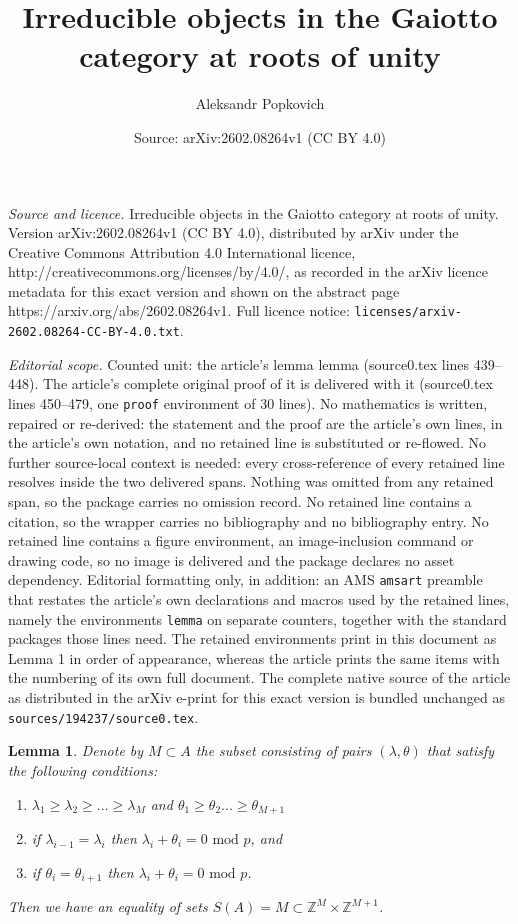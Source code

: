 \documentclass[10pt,a4paper]{amsart}
\title{Irreducible objects in the Gaiotto category at roots of unity}
\author{Aleksandr Popkovich}
\date{Source: arXiv:2602.08264v1 (CC BY 4.0)}
\newtheorem{lemma}{Lemma}
\begin{document}
\maketitle

\noindent\emph{Source and licence.} Irreducible objects in the Gaiotto category at roots of unity. Version arXiv:2602.08264v1 (CC BY 4.0), distributed by arXiv under the Creative Commons Attribution 4.0 International licence, http://creativecommons.org/licenses/by/4.0/, as recorded in the arXiv licence metadata for this exact version and shown on the abstract page https://arxiv.org/abs/2602.08264v1. Full licence notice: \texttt{licenses/arxiv-2602.08264-CC-BY-4.0.txt}.\par\smallskip

\noindent\textit{Editorial scope.} Counted unit: the article's lemma lemma (source0.tex lines 439--448). The article's complete original proof of it is delivered with it (source0.tex lines 450--479, one \texttt{proof} environment of 30 lines). No mathematics is written, repaired or re-derived: the statement and the proof are the article's own lines, in the article's own notation, and no retained line is substituted or re-flowed.  No further source-local context is needed: every cross-reference of every retained line resolves inside the two delivered spans.  Nothing was omitted from any retained span, so the package carries no omission record.  No retained line contains a citation, so the wrapper carries no bibliography and no bibliography entry.  No retained line contains a figure environment, an image-inclusion command or drawing code, so no image is delivered and the package declares no asset dependency.  Editorial formatting only, in addition: an AMS \texttt{amsart} preamble that restates the article's own declarations and macros used by the retained lines, namely the environments \texttt{lemma} on separate counters, together with the standard packages those lines need.  The retained environments print in this document as Lemma 1 in order of appearance, whereas the article prints the same items with the numbering of its own full document.  The complete native source of the article as distributed in the arXiv e-print for this exact version is bundled unchanged as \texttt{sources/194237/source0.tex}.
\begin{lemma}
Denote by $M \subset A$ the subset consisting of pairs $(\lambda, \theta)$ that satisfy the following  conditions:
\begin{enumerate}
    \item $\lambda_1 \ge \lambda_2 \ge ... \ge \lambda_M$ and $\theta_1\ge \theta_2 ... \ge \theta_{M+1}$
    \item if $\lambda_{i-1} =\lambda_i$ then $\lambda_i+\theta_i=0 \text{ mod }p$, and
    \item if $\theta_{i} =\theta_{i+1}$ then $\lambda_i+\theta_i=0 \text{ mod }p$.
\end{enumerate}

    Then we have an equality of sets $S(A)=M \subset \mathbb{Z}^M\times\mathbb{Z}^{M+1}$.
\end{lemma}
\end{document}
